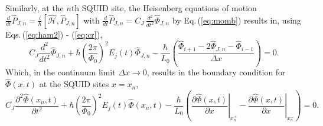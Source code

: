 \color{black}
Similarly, at the $n$th SQUID site, the Heisenberg equations of motion
$\displaystyle \frac{d}{dt} \hat{P}_{J, n} = \frac{i}{\hbar} \left[\hat{\mathcal{H}}, \hat{P}_{J, n} \right]$ 
with
$\displaystyle \frac{d}{dt} \hat{P}_{J,n} = C_J \, \frac{d^2}{dt^2} \hat{\Phi}_{J, n}$ 
by Eq.\,(\ref{eq:momb}) results in, using Eqs.\,(\ref{eq:ham2}) - (\ref{eq:cr}), 
%
\begin{equation}\label{BC_discrete}
C_{J} \frac{d^2}{dt^2} \hat{\Phi}_{J,n} +\hbar\left(\frac{2 \pi}{\Phi_{0}}\right)^{2} E_{j}(t) \hat{\Phi}_{J, n} -\frac{\hbar}{L_{0}}\left(\frac{\hat{\Phi}_{i+1} - 2 \hat{\Phi}_{J, n} - \hat{\Phi}_{i-1}}{\Delta x}\right)=0.
\end{equation}
%
Which, in the continuum limit $\Delta x \to 0$, results in the boundary condition for $\hat{\Phi}(x, t)$ at the SQUID sites $x = x_n$,
%
\begin{equation}\label{eq:BC_field_orig}
C_{J} \frac{\partial^2 \hat{\Phi}(x_n, t)}{\partial t^2} +\hbar\left(\frac{2 \pi}{\Phi_{0}}\right)^{2} E_{j}(t) \hat{\Phi}(x_n, t) -\frac{\hbar}{L_{0}}\left(\left.\frac{\partial \hat{\Phi}(x, t)}{\partial x}\right|_{x_n^{+}}-\left.\frac{\partial \hat{\Phi}(x,t)}{\partial x}\right|_{x_n^{-}}\right)=0.
\end{equation}

